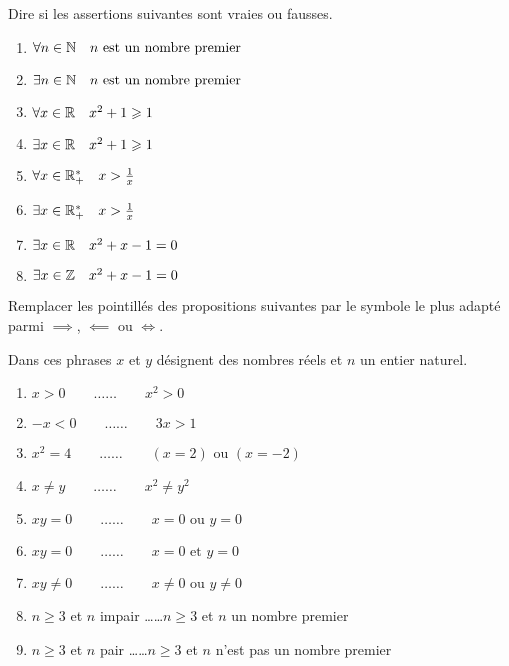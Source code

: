 \documentclass[11pt,class=report,crop=false]{standalone}
\begin{document}
\exercice{}
\enonce
Dire si les assertions suivantes sont vraies ou fausses.
\begin{enumerate}
    \item $\forall n \in \mathbb{N}  \quad n \text{ est un nombre premier }$
    \item $\exists n \in \mathbb{N}  \quad n \text{ est un nombre premier }$
    \item $\forall x \in \mathbb{R}  \quad x^2+1 \geqslant 1$      
    \item $\exists x \in \mathbb{R}  \quad x^2+1 \geqslant 1$  
    \item $\forall x \in \mathbb{R}^*_+  \quad x > \frac 1x$         
    \item $\exists x \in \mathbb{R}^*_+  \quad x > \frac 1x$
    \item $\exists x \in \mathbb{R}  \quad x^2+x-1 = 0$         
    \item $\exists x \in \mathbb{Z}  \quad x^2+x-1 = 0$                 
\end{enumerate} 
\finenonce


\finexercice



\exercice{}
\enonce
Remplacer les pointillés des propositions suivantes par le symbole le plus adapté parmi $\implies$, $\impliedby$ ou $\iff$.

Dans ces phrases $x$ et $y$ désignent des nombres réels et $n$ un entier naturel.

\begin{enumerate}
    \item $x > 0  \qquad \ldots\ldots \qquad x^2 > 0$
    \item $ -x < 0 \qquad \ldots\ldots \qquad 3x > 1$    
    \item $x^2 = 4  \qquad \ldots\ldots \qquad (x = 2)  \text{ ou } (x = -2)$      
    \item $x \neq y  \qquad \ldots\ldots \qquad x^2 \neq y^2$
    \item $xy = 0  \qquad \ldots\ldots \qquad x = 0 \text{ ou } y = 0$    
    \item $xy = 0  \qquad \ldots\ldots \qquad x = 0 \text{ et } y = 0$
    \item $xy \neq 0  \qquad \ldots\ldots \qquad x \neq 0 \text{ ou } y \neq 0$  
    \item $n \ge 3$ et $n$ impair  \qquad \ldots\ldots \qquad $n \ge 3$ et $n$ un nombre premier 
    \item $n \ge 3$ et $n$ pair  \qquad \ldots\ldots \qquad $n \ge 3$ et $n$ n'est pas un nombre premier      
\end{enumerate} 
\finenonce
\end{document}
